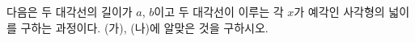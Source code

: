 \noindent\begin{minipage}[t]{0.58\linewidth}\vspace{0pt}\raggedright 다음은 두 대각선의 길이가 $a$, $b$이고 두 대각선이 이루는 각 $x$가 예각인 사각형의 넓이를 구하는 과정이다. (가), (나)에 알맞은 것을 구하시오. \end{minipage}\hfill\begin{minipage}[t]{0.4\linewidth}\vspace{0pt}\centering \resizebox{\ifdim\width>\linewidth\linewidth\else\width\fi}{!}{}\end{minipage}\par
\noindent {}
